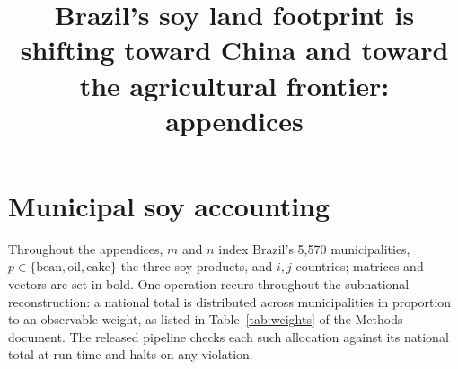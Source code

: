 \documentclass[pdflatex,sn-nature]{sn-jnl}%
\begin{document}
\title[Brazil's shifting soy land footprint: appendices]{Brazil's soy
land footprint is shifting toward China and toward the agricultural
frontier: appendices}

\author*[1]{ }



\maketitle

\appendix
{}

\section{Municipal soy accounting}\label{app:accounting}

Throughout the appendices, $m$ and $n$ index Brazil's 5{,}570
municipalities, $p\in\{\text{bean},\text{oil},\text{cake}\}$ the three soy
products, and $i,j$ countries; matrices and vectors are set in bold.
One operation recurs throughout the subnational reconstruction:
a national total is distributed across municipalities in proportion to
an observable weight, as listed in Table~\ref{tab:weights} of the
Methods document. The released pipeline checks each such allocation
against its national total at run time and halts on any violation.
\end{document}
